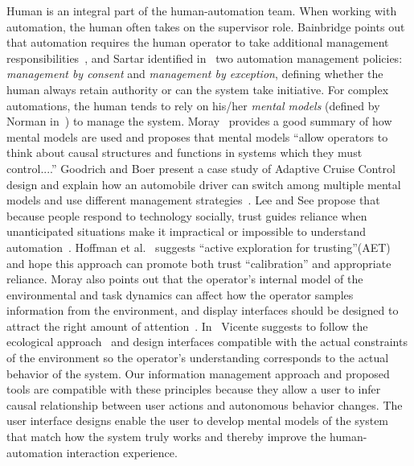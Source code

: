 Human is an integral part of the human-automation team. When working with automation, the human often takes on the supervisor role. Bainbridge points out that automation requires the human operator to take additional management responsibilities~\cite{Bainbridge1983Ironies}, and Sartar identified in~\cite{Sarter1998Making} two automation management policies: \textit{management by consent} and \textit{management by exception}, defining whether the human always retain authority or can the system take initiative. For complex automations, the human tends to rely on his/her \textit{mental models} (defined by Norman in~\cite{Norman1983Some}) to manage the system. Moray~\cite{Moray1999Mental} provides a good summary of how mental models are used and proposes that mental models ``allow operators to think about causal structures and functions in systems which they must control....'' Goodrich and Boer present a case study of Adaptive Cruise Control design and explain how an automobile driver can switch among multiple mental models and use different management strategies~\cite{Goodrich2002Multiple, Goodrich2003Model}. Lee and See propose that because people respond to technology socially, trust guides reliance when unanticipated situations make it impractical or impossible to understand automation~\cite{Lee2004Trust}. Hoffman et al.\ \cite{Hoffman2013Trust} suggests ``active exploration for trusting''(AET) and hope this approach can promote both trust ``calibration'' and appropriate reliance. Moray also points out that the operator's internal model of the environmental and task dynamics can affect how the operator samples information from the environment, and display interfaces should be designed to attract the right amount of attention~\cite{Moray1990Designing}. In~\cite{Vicente1997Should} Vicente suggests to follow the ecological approach~\cite{Rasmussen1994Cognitive} and design interfaces compatible with the actual constraints of the environment so the operator's understanding corresponds to the actual behavior of the system. Our information management approach and proposed tools are compatible with these principles because they allow a user to infer causal relationship between user actions and autonomous behavior changes. The user interface designs enable the user to develop mental models of the system that match how the system truly works and thereby improve the human-automation interaction experience.

